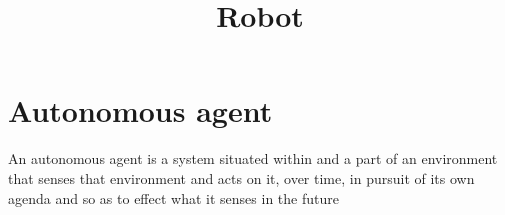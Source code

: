 \documentclass[a4paper]{article}
\title{Robot}
\date{}
\begin{document}
    \maketitle
    
    
    \section{Autonomous agent}
        An autonomous agent is a system situated within and a part of an environment that senses that environment and acts on it, over time, in pursuit of its own agenda and so as to effect what it senses in the future
        \cite{franklin-1997-is-it-an-agent-or-just-a-program-a-taxonomy-for-autonomous-agents}
        
        
        
        
        
\end{document}

